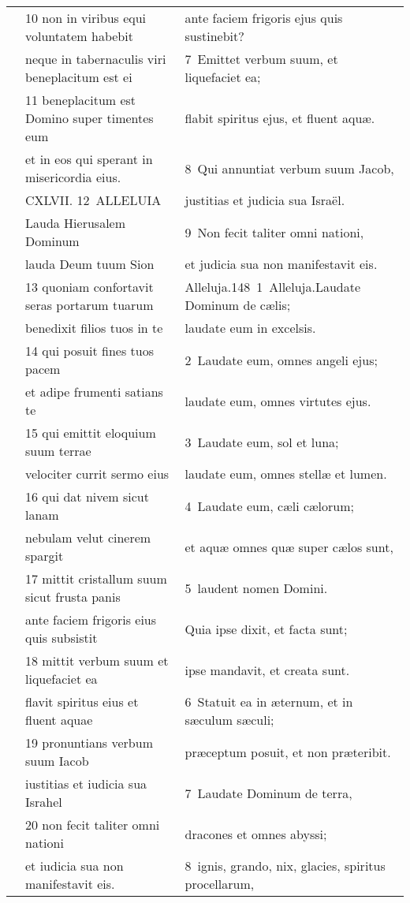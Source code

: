 \documentclass{article}
\begin{document}
\begin{longtable}{@{}p{}p{}p{}@{}}
	&	10 non in viribus equi voluntatem habebit	&	ante faciem frigoris ejus quis sustinebit?	\\
	&	neque in tabernaculis viri beneplacitum est ei	&	7 Emittet verbum suum, et liquefaciet ea;	\\
	&	11 beneplacitum est Domino super timentes eum	&	flabit spiritus ejus, et fluent aquæ.	\\
	&	et in eos qui sperant in misericordia eius.	&	8 Qui annuntiat verbum suum Jacob,	\\
	&	CXLVII. 12 ALLELUIA	&	justitias et judicia sua Israël.	\\
	&	Lauda Hierusalem Dominum	&	9 Non fecit taliter omni nationi,	\\
	&	lauda Deum tuum Sion	&	et judicia sua non manifestavit eis.	\\
	&	13 quoniam confortavit seras portarum tuarum	&	Alleluja.148 1 Alleluja.Laudate Dominum de cælis;	\\
	&	benedixit filios tuos in te	&	laudate eum in excelsis.	\\
	&	14 qui posuit fines tuos pacem	&	2 Laudate eum, omnes angeli ejus;	\\
	&	et adipe frumenti satians te	&	laudate eum, omnes virtutes ejus.	\\
	&	15 qui emittit eloquium suum terrae	&	3 Laudate eum, sol et luna;	\\
	&	velociter currit sermo eius	&	laudate eum, omnes stellæ et lumen.	\\
	&	16 qui dat nivem sicut lanam	&	4 Laudate eum, cæli cælorum;	\\
	&	nebulam velut cinerem spargit	&	et aquæ omnes quæ super cælos sunt,	\\
	&	17 mittit cristallum suum sicut frusta panis	&	5 laudent nomen Domini.	\\
	&	ante faciem frigoris eius quis subsistit	&	Quia ipse dixit, et facta sunt;	\\
	&	18 mittit verbum suum et liquefaciet ea	&	ipse mandavit, et creata sunt.	\\
	&	flavit spiritus eius et fluent aquae	&	6 Statuit ea in æternum, et in sæculum sæculi;	\\
	&	19 pronuntians verbum suum Iacob	&	præceptum posuit, et non præteribit.	\\
	&	iustitias et iudicia sua Israhel	&	7 Laudate Dominum de terra,	\\
	&	20 non fecit taliter omni nationi	&	dracones et omnes abyssi;	\\
	&	et iudicia sua non manifestavit eis.	&	8 ignis, grando, nix, glacies, spiritus procellarum,	\\

\end{longtable}
\end{document}
